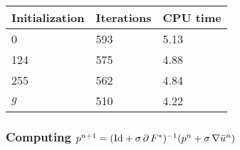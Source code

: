            \begin{center}
                \begin{tabular}{| l | l | l |}
                \hline
                Initialization & Iterations & CPU time \\ \hline\hline
                0 & 593 & 5.13 \\ \hline
                124 & 575 & 4.88 \\ \hline
                255 & 562 & 4.84 \\ \hline
                $g$ & 510 & 4.22 \\ \hline
                \end{tabular}
                \label{tab:init_compare}
            \end{center}

        \subsubsection{Computing $p^{n+1} = (\textnormal{Id} + \sigma\,\partial\,F^{\ast})^{-1}(p^{n} + \sigma\,\nabla\bar{u}^{n})$}
        \label{sub:computing_p}

